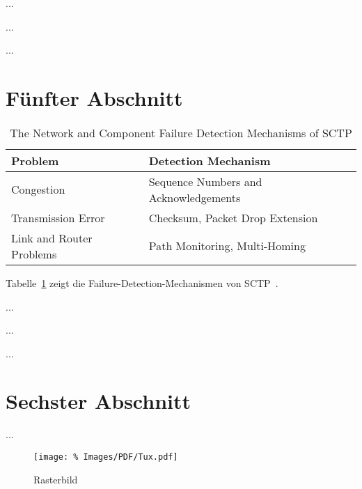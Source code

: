 ...

...

...



\section{Fünfter Abschnitt}
\label{sec:Abschnitt5}

\begin{table}
\begin{center}
\begin{tabular}{|l|l|}
\hline
Problem&
Detection Mechanism
\tabularnewline
\hline
\hline
Congestion&
Sequence Numbers and Acknowledgements
\tabularnewline
\hline
Transmission Error&
Checksum, Packet Drop Extension
\tabularnewline
\hline
Link and Router Problems&
Path Monitoring, Multi-Homing
\tabularnewline
\hline
\end{tabular}
\caption{The Network and Component Failure Detection Mechanisms of SCTP}
\label{tbl:The-Component-Failure-Detection-Mechanisms-of-SCTP}
\end{center}
\end{table}

Tabelle~\ref{tbl:The-Component-Failure-Detection-Mechanisms-of-SCTP} zeigt
die Failure-Detection-Mechanismen von SCTP~\cite{RFC2960}.

...

...

...



\section{Sechster Abschnitt}
\label{sec:Abschnitt6}

...

\begin{figure}
\begin{center}
\texttt{[image: \%
   Images/PDF/Tux.pdf]}
\end{center}
\caption{Rasterbild}
\label{cap:Rasterbild}
\end{figure}

